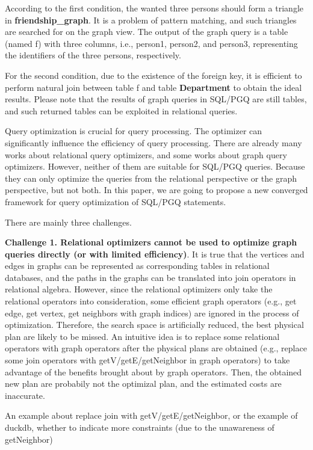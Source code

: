 \begin{example}
    According to the first condition, the wanted three persons should form a triangle in \textbf{friendship\_graph}.
    It is a problem of pattern matching, and such triangles are searched for on the graph view.
    The output of the graph query is a table (named f) with three columns, i.e., person1, person2, and person3, representing the identifiers of the three persons, respectively.

    For the second condition, due to the existence of the foreign key, it is efficient to perform natural join between table f and table \textbf{Department} to obtain the ideal results.
    Please note that the results of graph queries in SQL/PGQ are still tables, and such returned tables can be exploited in relational queries.
\end{example}

Query optimization is crucial for query processing.
The optimizer can significantly influence the efficiency of query processing.
There are already many works about relational query optimizers, and some works about graph query optimizers.
However, neither of them are suitable for SQL/PGQ queries.
Because they can only optimize the queries from the relational perspective or the graph perspective, but not both.
In this paper, we are going to propose a new converged framework for query optimization of SQL/PGQ statements.

There are mainly three challenges.

\textbf{Challenge 1. Relational optimizers cannot be used to optimize graph queries directly (or with limited efficiency)}.
It is true that the vertices and edges in graphs can be represented as corresponding tables in relational databases, and the paths in the graphs can be translated into join operators in relational algebra.
However, since the relational optimizers only take the relational operators into consideration, some efficient graph operators (e.g., get edge, get vertex, get neighbors with graph indices) are ignored in the process of optimization.
Therefore, the search space is artificially reduced, the best physical plan are likely to be missed.
An intuitive idea is to replace some relational operators with graph operators after the physical plans are obtained (e.g., replace some join operators with getV/getE/getNeighbor in graph operators) to take advantage of the benefits brought about by graph operators.
Then, the obtained new plan are probabily not the optimizal plan, and the estimated costs are inaccurate.

\begin{example}
    An example about replace join with getV/getE/getNeighbor,
    or the example of duckdb, whether to indicate more constraints (due to the unawareness of getNeighbor)
\end{example}


